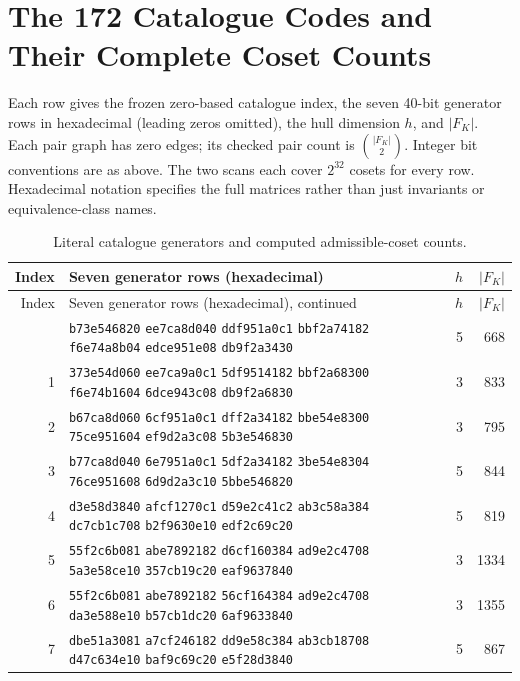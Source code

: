 \section{The 172 Catalogue Codes and Their Complete Coset Counts}
\label{app:catalogue}
Each row gives the frozen zero-based catalogue index, the seven 40-bit generator rows in hexadecimal (leading zeros omitted), the hull dimension $h$, and $|F_K|$. Each pair graph has zero edges; its checked pair count is $\binom{|F_K|}{2}$. Integer bit conventions are as above. The two scans each cover $2^{32}$ cosets for every row. Hexadecimal notation specifies the full matrices rather than just invariants or equivalence-class names.
\begingroup\small
\begin{longtable}{@{}r p{12cm} r r@{}}
\caption{Literal catalogue generators and computed admissible-coset counts.}\\
\toprule
Index & Seven generator rows (hexadecimal) & $h$ & $|F_K|$\\
\midrule\endfirsthead
\toprule Index & Seven generator rows (hexadecimal), continued & $h$ & $|F_K|$\\\midrule\endhead
\bottomrule\endfoot
0 & \texttt{b73e546820} \texttt{ee7ca8d040} \texttt{ddf951a0c1} \texttt{bbf2a74182} \texttt{f6e74a8b04} \texttt{edce951e08} \texttt{db9f2a3430} & 5 & 668 \\
1 & \texttt{373e54d060} \texttt{ee7ca9a0c1} \texttt{5df9514182} \texttt{bbf2a68300} \texttt{f6e74b1604} \texttt{6dce943c08} \texttt{db9f2a6830} & 3 & 833 \\
2 & \texttt{b67ca8d060} \texttt{6cf951a0c1} \texttt{dff2a34182} \texttt{bbe54e8300} \texttt{75ce951604} \texttt{ef9d2a3c08} \texttt{5b3e546830} & 3 & 795 \\
3 & \texttt{b77ca8d040} \texttt{6e7951a0c1} \texttt{5df2a34182} \texttt{3be54e8304} \texttt{76ce951608} \texttt{6d9d2a3c10} \texttt{5bbe546820} & 5 & 844 \\
4 & \texttt{d3e58d3840} \texttt{afcf1270c1} \texttt{d59e2c41c2} \texttt{ab3c58a384} \texttt{dc7cb1c708} \texttt{b2f9630e10} \texttt{edf2c69c20} & 5 & 819 \\
5 & \texttt{55f2c6b081} \texttt{abe7892182} \texttt{d6cf160384} \texttt{ad9e2c4708} \texttt{5a3e58ce10} \texttt{357cb19c20} \texttt{eaf9637840} & 3 & 1334 \\
6 & \texttt{55f2c6b081} \texttt{abe7892182} \texttt{56cf164384} \texttt{ad9e2c4708} \texttt{da3e588e10} \texttt{b57cb1dc20} \texttt{6af9633840} & 3 & 1355 \\
7 & \texttt{dbe51a3081} \texttt{a7cf246182} \texttt{dd9e58c384} \texttt{ab3cb18708} \texttt{d47c634e10} \texttt{baf9c69c20} \texttt{e5f28d3840} & 5 & 867 \\

\end{longtable}
